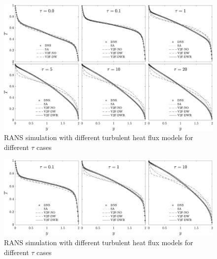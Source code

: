 \documentclass[10pt]{article}
\begin{document}
\begin{figure}[h]
\centering
\includegraphics[width=1.1\textwidth]{../solution/Figures/Tempgrey.pdf}
\caption{\noindent RANS simulation with different turbulent heat flux models for different $\tau$ cases}
\label{constk}
\end{figure}

\begin{figure}[h]
\centering
\includegraphics[width=1.1\textwidth]{../solution/Figures_r/Tempvar.pdf}
\caption{\noindent RANS simulation with different turbulent heat flux models for different $\tau$ cases}
\label{vark}
\end{figure}
\end{document}
